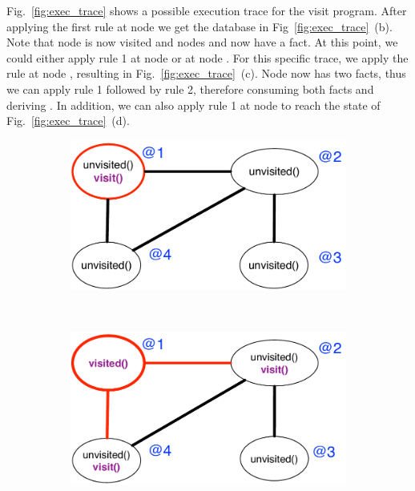 Fig.~\ref{fig:exec_trace} shows a possible execution trace for the visit
program. After applying the first rule at node  we get the database in
Fig~\ref{fig:exec_trace}~(b).  Note that node  is now visited and nodes
 and  now have a  fact. At this point, we could
either apply rule 1 at node  or at node .  For this specific
trace, we apply the rule at node , resulting in
Fig.~\ref{fig:exec_trace}~(c). Node  now has two  facts,
thus we can apply rule 1 followed by rule 2, therefore consuming both
 facts and deriving . In addition, we can also apply
rule 1 at node  to reach the state of Fig.~\ref{fig:exec_trace}~(d).

\begin{figure}[h]
        \centering
        \begin{subfigure}[b]{0.45\textwidth}
                \includegraphics[width=\textwidth]{figures/visit/trace1}
                \label{fig:exec_trace1}
        \end{subfigure}%
        ~ %
        \begin{subfigure}[b]{0.45\textwidth}
                \includegraphics[width=\textwidth]{figures/visit/trace2}

\end{subfigure}
\end{figure}

